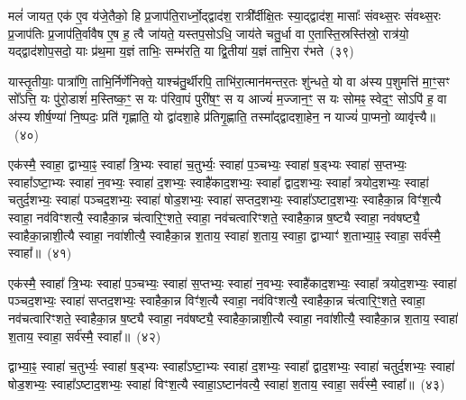मलं॑ जायत॒ एक॑ ए॒व य॑जे॒तैको॒ हि प्र॒जा\-प॑ति॒रार्ध्नो॒द्द्वाद॑श॒ रात्री᳚र्दीक्षि॒तः स्या॒द्द्वाद॑श॒ मासाः᳚ संवथ्स॒रः सं॑वथ्स॒रः प्र॒जा\-प॑तिः प्र॒जा\-प॑ति॒र्वावैष ए॒ष ह॒ त्वै जा॑यते॒ यस्तप॒सो\-ऽधि॒ जाय॑ते चतु॒र्धा वा ए॒तास्ति॒स्रस्ति॑स्रो॒ रात्र॑यो॒ यद्द्वाद॑शोप॒सदो॒ याः प्र॑थ॒मा य॒ज्ञं ताभिः॒ सम्भ॑रति॒ या द्वि॒तीया॑ य॒ज्ञं ताभि॒रा र॑भते~(३९)\ip

यास्तृ॒तीयाः॒ पात्रा॑णि॒ ताभि॒र्निर्णे॑निक्ते॒ याश्च॑तु॒र्थीरपि॒ ताभि॑रा॒त्मान॑मन्तर॒तः शु॑न्धते॒ यो वा अ॑स्य प॒शुमत्ति॑ मा॒ꣳ॒सꣳ सो᳚\-ऽत्ति॒ यः पु॑रो॒डाशं॑ म॒स्तिष्क॒ꣳ॒ स यः प॑रिवा॒पं पुरी॑ष॒ꣳ॒ स य आज्यं॑ म॒ज्जान॒ꣳ॒ स यः सोमꣴ॒ स्वेद॒ꣳ॒ सो\-ऽपि॑ ह॒ वा अ॑स्य शीर्\mbox{}ष॒ण्या॑ नि॒ष्पदः॒ प्रति॑ गृह्णाति॒ यो द्वा॑दशा॒हे प्र॑तिगृ॒ह्णाति॒ तस्मा᳚द्\-द्वादशा॒हेन॒ न याज्यं॑ पा॒प्मनो॒ व्यावृ॑त्त्यै॥~(४०)\ip

{\anuvakamend[{अय॑च्छ॒दधि॑ रभते द्वादशा॒हेन॑ च॒त्वारि॑ च}]}%

एक॑स्मै॒ स्वाहा॒ द्वाभ्या॒ꣴ॒ स्वाहा᳚ त्रि॒भ्यः स्वाहा॑ च॒तुर्भ्यः॒ स्वाहा॑ प॒ञ्चभ्यः॒ स्वाहा॑ ष॒ड्भ्यः स्वाहा॑ स॒प्तभ्यः॒ स्वाहा᳚\-ऽष्टा॒भ्यः स्वाहा॑ न॒वभ्यः॒ स्वाहा॑ द॒शभ्यः॒ स्वाहै॑काद॒शभ्यः॒ स्वाहा᳚ द्वाद॒शभ्यः॒ स्वाहा᳚ त्रयोद॒शभ्यः॒ स्वाहा॑ चतुर्द॒शभ्यः॒ स्वाहा॑ पञ्चद॒शभ्यः॒ स्वाहा॑ षोड॒शभ्यः॒ स्वाहा॑ सप्तद॒शभ्यः॒ स्वाहा᳚\-ऽष्टाद॒शभ्यः॒ स्वाहैका॒न्न विꣳ॑श॒त्यै स्वाहा॒ नव॑विꣳशत्यै॒ स्वाहैका॒न्न च॑त्वारि॒ꣳ॒शते॒ स्वाहा॒ नव॑चत्वारिꣳशते॒ स्वाहैका॒न्न ष॒ष्ट्यै स्वाहा॒ नव॑षष्ट्यै॒ स्वाहैका॒न्नाशी॒त्यै स्वाहा॒ नवा॑शीत्यै॒ स्वाहैका॒न्न श॒ताय॒ स्वाहा॑ श॒ताय॒ स्वाहा॒ द्वाभ्याꣳ॑ श॒ताभ्या॒ꣴ॒ स्वाहा॒ सर्व॑स्मै॒ स्वाहा᳚॥~(४१)\ip

{}%

एक॑स्मै॒ स्वाहा᳚ त्रि॒भ्यः स्वाहा॑ प॒ञ्चभ्यः॒ स्वाहा॑ स॒प्तभ्यः॒ स्वाहा॑ न॒वभ्यः॒ स्वाहै॑काद॒शभ्यः॒ स्वाहा᳚ त्रयोद॒शभ्यः॒ स्वाहा॑ पञ्चद॒शभ्यः॒ स्वाहा॑ सप्तद॒शभ्यः॒ स्वाहैका॒न्न विꣳ॑श॒त्यै स्वाहा॒ नव॑विꣳशत्यै॒ स्वाहैका॒न्न च॑त्वारि॒ꣳ॒शते॒ स्वाहा॒ नव॑चत्वारिꣳशते॒ स्वाहैका॒न्न ष॒ष्ट्यै स्वाहा॒ नव॑षष्ट्यै॒ स्वाहैका॒न्नाशी॒त्यै स्वाहा॒ नवा॑शीत्यै॒ स्वाहैका॒न्न श॒ताय॒ स्वाहा॑ श॒ताय॒ स्वाहा॒ सर्व॑स्मै॒ स्वाहा᳚॥~(४२)\ip

{\anuvakamend[{एक॑स्मै त्रि॒भ्यः प॑ञ्चा॒शत्}]}%

द्वाभ्या॒ꣴ॒ स्वाहा॑ च॒तुर्भ्यः॒ स्वाहा॑ ष॒ड्भ्यः स्वाहा᳚\-ऽष्टा॒भ्यः स्वाहा॑ द॒शभ्यः॒ स्वाहा᳚ द्वाद॒शभ्यः॒ स्वाहा॑ चतुर्द॒शभ्यः॒ स्वाहा॑ षोड॒शभ्यः॒ स्वाहा᳚\-ऽष्टाद॒शभ्यः॒ स्वाहा॑ विꣳश॒त्यै स्वाहा॒\-ऽष्टान॑वत्यै॒ स्वाहा॑ श॒ताय॒ स्वाहा॒ सर्व॑स्मै॒ स्वाहा᳚॥~(४३)\ip

